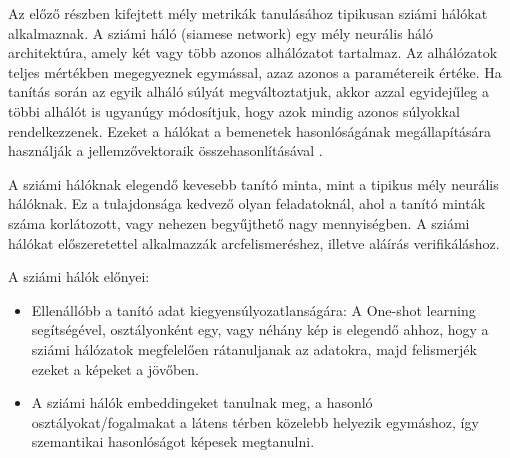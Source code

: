 Az előző részben kifejtett mély metrikák tanulásához tipikusan sziámi hálókat alkalmaznak. A sziámi háló (siamese network) egy mély neurális háló architektúra, amely két vagy több azonos alhálózatot tartalmaz. Az alhálózatok teljes mértékben megegyeznek egymással, azaz azonos a paramétereik értéke. Ha tanítás során az egyik alháló súlyát megváltoztatjuk, akkor azzal egyidejűleg a többi alhálót is ugyanúgy módosítjuk, hogy azok mindig azonos súlyokkal rendelkezzenek. Ezeket a hálókat a bemenetek hasonlóságának megállapítására használják a jellemzővektoraik összehasonlításával \cite{bromley1993siamese}. 

A sziámi hálóknak elegendő kevesebb tanító minta, mint a tipikus mély neurális hálóknak. Ez a tulajdonsága kedvező olyan feladatoknál, ahol a tanító minták száma korlátozott, vagy nehezen begyűjthető nagy mennyiségben. A sziámi hálókat előszeretettel alkalmazzák arcfelismeréshez, illetve aláírás verifikáláshoz.

A sziámi hálók előnyei:
\begin{itemize}
	\item Ellenállóbb a tanító adat kiegyensúlyozatlanságára: A One-shot learning segítségével, osztályonként egy, vagy néhány kép is elegendő ahhoz, hogy a sziámi hálózatok megfelelően rátanuljanak az adatokra, majd felismerjék ezeket a képeket a jövőben.
	\item A sziámi hálók embeddingeket tanulnak meg, a hasonló osztályokat/fogalmakat a látens térben közelebb helyezik egymáshoz, így szemantikai hasonlóságot képesek megtanulni.
\end{itemize}





